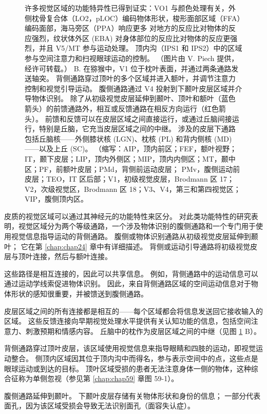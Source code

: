 \begin{figure}[htbp]
{		许多视觉区域的功能特异性已得到证实：VO1 与颜色处理有关，外侧枕骨复合体（LO2，pLOC）编码物体形状，梭形面部区域（FFA）编码面部，海马旁区（PPA）响应更多 对地方的反应比对物体的反应强烈，纹状体外区 (EBA) 对身体部位的反应比对物体的反应更强烈，并且 V5/MT 参与运动处理。 
		顶内沟（IPS1 和 IPS2）中的区域参与空间注意力和扫视眼球运动的控制。 （图片由 V. Piech 提供，经许可转载。） 
		B. 在猕猴中，V1 位于枕叶表面，并通过两条通路发送轴突。 
		背侧通路穿过顶叶的多个区域并进入额叶，并调节注意力控制和视觉引导运动。 
		腹侧通路通过 V4 投射到下颞叶皮层区域并介导物体识别。 
		除了从初级视觉皮层延伸到颞叶、顶叶和额叶（蓝色箭头）的前馈通路外，相互或反馈通路在相反方向运行（红色箭头）。 
		前馈和反馈可以在皮层区域之间直接运行，或通过丘脑间接运行，特别是丘脑，它充当皮层区域之间的中继。 
		涉及的皮层下通路包括丘脑核——外侧膝状核 (LGN)、枕核 (PL) 和背内侧核 (MD)——以及上丘 (SC)。 （缩写：AIP，顶内前区；FEF，额叶视野；IT，颞下皮层；LIP，顶内外侧区；MIP，顶内内侧区；MT，颞中区；PF，前额叶皮层；PMd，背侧前运动皮层； PMv，腹侧运动前皮层；TEO，IT 区后部；V1，初级视觉皮层，Brodmann 区 17；V2，次级视觉区，Brodmann 区 18；V3、V4，第三和第四视觉区；VIP，腹侧顶内区。 }
	\label{fig:21_7}
\end{figure}


皮质的视觉区域可以通过其神经元的功能特性来区分。 
对此类功能特性的研究表明，视觉区域分为两个等级通路，一个涉及物体识别的腹侧通路和一个专门用于使用视觉信息指导运动的背侧通路。 
腹侧或物体识别通路从初级视觉皮层延伸到颞叶； 它在第 \ref{chap:chap24} 章中有详细描述。
背侧或运动引导通路将初级视觉皮层与顶叶连接，然后与额叶连接。


这些路径是相互连接的，因此可以共享信息。 
例如，背侧通路中的运动信息可以通过运动学线索促进物体识别。 
因此，来自背侧通路区域的空间运动信息对于物体形状的感知很重要，并被馈送到腹侧通路。


皮层区域之间的所有连接都是相互的——每个区域都会将信息发送回它接收输入的区域。 
这些反馈连接向早期视觉处理水平提供有关认知功能的信息，包括空间注意力、刺激预期和情感内容。 
丘脑中的枕作为皮层区域之间的中继（见图 \ref{fig:21_7} B）。


背侧通路穿过顶叶皮层，该区域使用视觉信息来指导眼睛和四肢的运动，即视觉运动整合。 
侧顶内区域因其位于顶内沟中而得名，参与表示空间中的点，这些点是眼球运动或到达的目标。 
顶叶区域受损的患者无法注意身体一侧的物体，这种综合征称为单侧忽视（参见第 \ref{chap:chap59} 章图 59-1）。


腹侧通路延伸到颞叶。 
下颞叶皮层存储有关物体形状和身份的信息； 
一部分代表面孔，因为该区域受损会导致无法识别面孔（面容失认症）。


